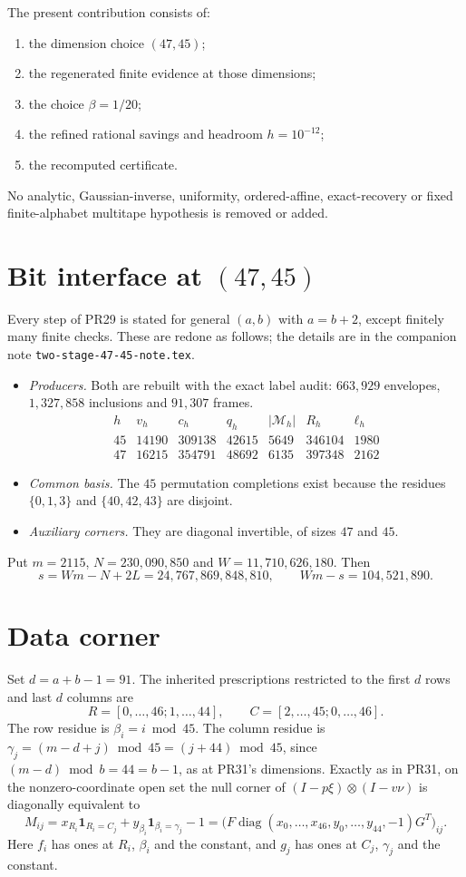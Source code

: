 \documentclass[11pt]{article}
\begin{document}
The present contribution consists of:
\begin{enumerate}
\item the dimension choice $(47,45)$;
\item the regenerated finite evidence at those dimensions;
\item the choice $\beta=1/20$;
\item the refined rational savings and headroom $h=10^{-12}$;
\item the recomputed certificate.
\end{enumerate}
No analytic, Gaussian-inverse, uniformity, ordered-affine, exact-recovery
or fixed finite-alphabet multitape hypothesis is removed or added.

\section{Bit interface at $(47,45)$}
Every step of PR29 is stated for general $(a,b)$ with $a=b+2$, except
finitely many finite checks. These are redone as follows; the details are
in the companion note \texttt{two-stage-47-45-note.tex}.
\begin{itemize}
\item \emph{Producers.} Both are rebuilt with the exact label audit:
$663{,}929$ envelopes, $1{,}327{,}858$ inclusions and $91{,}307$ frames.
\[
\begin{array}{c|rrrrrr}
h&v_h&c_h&q_h&|\mathcal M_h|&R_h&\ell_h\\\hline
45&14190&309138&42615&5649&346104&1980\\
47&16215&354791&48692&6135&397348&2162
\end{array}
\]
\item \emph{Common basis.} The $45$ permutation completions exist because
the residues $\{0,1,3\}$ and $\{40,42,43\}$ are disjoint.
\item \emph{Auxiliary corners.} They are diagonal invertible, of sizes $47$
and $45$.
\end{itemize}

Put $m=2115$, $N=230{,}090{,}850$ and $W=11{,}710{,}626{,}180$. Then
\[
 s=Wm-N+2L=24{,}767{,}869{,}848{,}810,\qquad Wm-s=104{,}521{,}890.
\]

\section{Data corner}
Set $d=a+b-1=91$. The inherited prescriptions restricted to the first $d$
rows and last $d$ columns are
\[
R=[0,\ldots,46;1,\ldots,44],\qquad C=[2,\ldots,45;0,\ldots,46].
\]
The row residue is $\beta_i=i\bmod45$. The column residue is
$\gamma_j=(m-d+j)\bmod45=(j+44)\bmod45$, since $(m-d)\bmod b=44=b-1$, as at
PR31's dimensions. Exactly as in PR31, on the nonzero-coordinate open set
the null corner of $(I-p\xi)\otimes(I-v\nu)$ is diagonally equivalent to
\[
 M_{ij}=x_{R_i}\mathbf 1_{R_i=C_j}+y_{\beta_i}\mathbf 1_{\beta_i=\gamma_j}-1
 =\bigl(F\operatorname{diag}(x_0,\ldots,x_{46},y_0,\ldots,y_{44},-1)G^T\bigr)_{ij}.
\]
Here $f_i$ has ones at $R_i$, $\beta_i$ and the constant, and $g_j$ has ones
at $C_j$, $\gamma_j$ and the constant.
\end{document}
